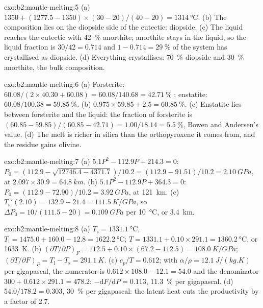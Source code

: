 \begin{solution}{exo:b2:mantle-melting:5}
(a) $1350 + (1277.5 - 1350)\times(30 - 20)/(40 - 20) = \qty{1314}{\celsius}$.
(b) The composition lies on the diopside side of the eutectic: diopside.
(c) The liquid reaches the eutectic with \qty{42}{\percent} anorthite; anorthite
stays in the liquid, so the liquid fraction is $30/42 = 0.714$ and $1 - 0.714 =
\qty{29}{\percent}$ of the system has crystallised as diopside. (d) Everything
crystallises: \qty{70}{\percent} diopside and \qty{30}{\percent} anorthite, the
bulk composition.
\end{solution}

\begin{solution}{exo:b2:mantle-melting:6}
(a) Forsterite: $60.08/(2\times40.30 + 60.08) = 60.08/140.68 =
\qty{42.71}{\percent}$ ; enstatite: $60.08/100.38 = \qty{59.85}{\percent}$.
(b) $0.975\times59.85 + 2.5 = \qty{60.85}{\percent}$. (c) Enstatite lies between
forsterite and the liquid: the fraction of forsterite is $(60.85 - 59.85)/(60.85 -
42.71) = 1.00/18.14 = \qty{5.5}{\percent}$, Bowen and Andersen's value. (d) The
melt is richer in silica than the orthopyroxene it comes from, and the residue
gains olivine.
\end{solution}

\begin{solution}{exo:b2:mantle-melting:7}
(a) $5.1P^2 - 112.9P + 214.3 = 0$: $P_0 = (112.9 - \sqrt{12746.4 -
4371.7})/10.2 = (112.9 - 91.51)/10.2 = \qty{2.10}{GPa}$, at $2.097\times30.9 =
\qty{64.8}{km}$. (b) $5.1P^2 - 112.9P + 364.3 = 0$: $P_0 = (112.9 -
72.90)/10.2 = \qty{3.92}{GPa}$, at \qty{121}{km}. (c) $T_{\mathrm s}'(2.10) = 132.9
- 21.4 = \qty{111.5}{K/GPa}$, so $\Delta P_0 = 10/(111.5 - 20) = \qty{0.109}{GPa}$
per \qty{10}{\celsius}, or \qty{3.4}{km}.
\end{solution}

\begin{solution}{exo:b2:mantle-melting:8}
(a) $T_{\mathrm s} = \qty{1331.1}{\celsius}$, $T_{\mathrm l} = 1475.0 + 160.0 -
12.8 = \qty{1622.2}{\celsius}$; $T = 1331.1 + 0.10\times291.1 =
\qty{1360.2}{\celsius}$, or \qty{1633}{K}. (b) $(\partial T/\partial P)_F = 112.5
+ 0.10\times(67.2 - 112.5) = \qty{108.0}{K/GPa}$; $(\partial T/\partial F)_P =
T_{\mathrm l} - T_{\mathrm s} = \qty{291.1}{K}$. (c) $c_p/T = 0.612$; with $\alpha/\rho
= \qty{12.1}{J/(kg.K)}$ per gigapascal, the numerator is $0.612\times108.0 - 12.1
= 54.0$ and the denominator $300 + 0.612\times291.1 = 478.2$: $-\mathrm dF/\mathrm
dP = 0.113$, \qty{11.3}{\percent} per gigapascal. (d) $54.0/178.2 = 0.303$,
\qty{30}{\percent} per gigapascal: the latent heat cuts the productivity by a
factor of 2.7.
\end{solution}


